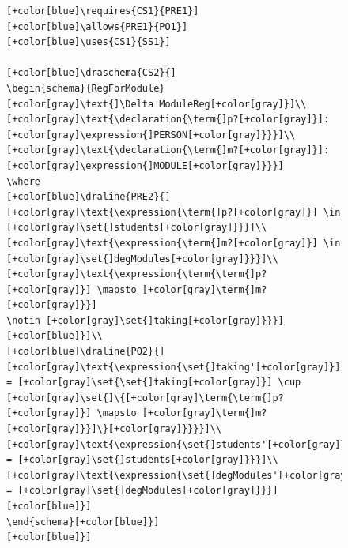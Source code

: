 \begin{figure}[H]
\begin{minipage}{0.45\textwidth}
\begin{tiny}
\begin{BVerbatim}[commandchars=+\[\]]
[+color[blue]\requires{CS1}{PRE1}]
[+color[blue]\allows{PRE1}{PO1}]
[+color[blue]\uses{CS1}{SS1}]

[+color[blue]\draschema{CS2}{]
\begin{schema}{RegForModule}
[+color[gray]\text{]\Delta ModuleReg[+color[gray]}]\\
[+color[gray]\text{\declaration{\term{]p?[+color[gray]}]: [+color[gray]\expression{]PERSON[+color[gray]}}}]\\
[+color[gray]\text{\declaration{\term{]m?[+color[gray]}]: [+color[gray]\expression{]MODULE[+color[gray]}}}]
\where
[+color[blue]\draline{PRE2}{]
[+color[gray]\text{\expression{\term{]p?[+color[gray]}] \in [+color[gray]\set{]students[+color[gray]}}}]\\
[+color[gray]\text{\expression{\term{]m?[+color[gray]}] \in [+color[gray]\set{]degModules[+color[gray]}}}]\\
[+color[gray]\text{\expression{\term{\term{]p?[+color[gray]}] \mapsto [+color[gray]\term{]m?[+color[gray]}}]
\notin [+color[gray]\set{]taking[+color[gray]}}}][+color[blue]}]\\
[+color[blue]\draline{PO2}{]
[+color[gray]\text{\expression{\set{]taking'[+color[gray]}] = [+color[gray]\set{\set{]taking[+color[gray]}] \cup
[+color[gray]\set{]\{[+color[gray]\term{\term{]p?[+color[gray]}] \mapsto [+color[gray]\term{]m?[+color[gray]}}]\}[+color[gray]}}}}]\\
[+color[gray]\text{\expression{\set{]students'[+color[gray]}] = [+color[gray]\set{]students[+color[gray]}}}]\\
[+color[gray]\text{\expression{\set{]degModules'[+color[gray]}] = [+color[gray]\set{]degModules[+color[gray]}}}][+color[blue]}]
\end{schema}[+color[blue]}]
[+color[blue]}]


\end{BVerbatim}
\end{tiny}
\end{minipage}
\end{figure}
